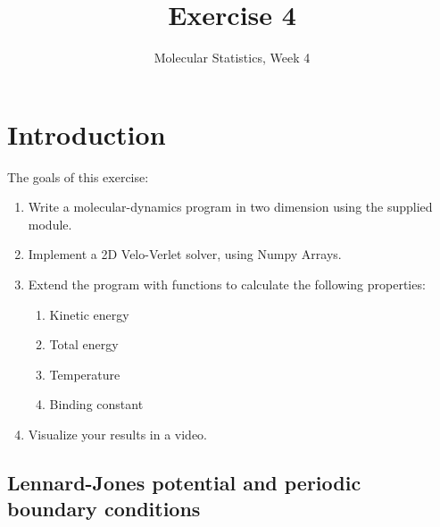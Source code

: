 \documentclass{article}
\title{Exercise 4}
\author{Molecular Statistics, Week 4}
\date{}
\begin{document}

\maketitle

\section{Introduction}

The goals of this exercise:
\begin{enumerate}
    \item Write a molecular-dynamics program in two dimension using the supplied module.

    \item Implement a 2D Velo-Verlet solver, using Numpy Arrays.

    \item Extend the program with functions to calculate the following properties:

    \begin{enumerate}
        \item Kinetic energy
        \item Total energy
        \item Temperature
        \item Binding constant
    \end{enumerate}

    \item Visualize your results in a video.

\end{enumerate}


\subsection{Lennard-Jones potential and periodic boundary conditions}
\end{document}
